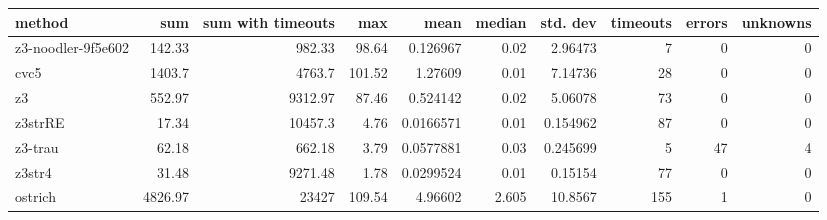 \begin{tabular}{lrrrrrrrrr}
\hline
 method             &     sum &   sum with timeouts &    max &      mean &   median &   std. dev &   timeouts &   errors &   unknowns \\
\hline
 z3-noodler-9f5e602 &  142.33 &              982.33 &  98.64 & 0.126967  &    0.02  &   2.96473  &          7 &        0 &          0 \\
 cvc5               & 1403.7  &             4763.7  & 101.52 & 1.27609   &    0.01  &   7.14736  &         28 &        0 &          0 \\
 z3                 &  552.97 &             9312.97 &  87.46 & 0.524142  &    0.02  &   5.06078  &         73 &        0 &          0 \\
 z3strRE            &   17.34 &            10457.3  &   4.76 & 0.0166571 &    0.01  &   0.154962 &         87 &        0 &          0 \\
 z3-trau            &   62.18 &              662.18 &   3.79 & 0.0577881 &    0.03  &   0.245699 &          5 &       47 &          4 \\
 z3str4             &   31.48 &             9271.48 &   1.78 & 0.0299524 &    0.01  &   0.15154  &         77 &        0 &          0 \\
 ostrich            & 4826.97 &            23427    & 109.54 & 4.96602   &    2.605 &  10.8567   &        155 &        1 &          0 \\
\hline
\end{tabular}
